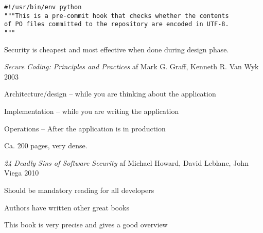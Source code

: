 \documentclass[Screen16to9,17pt]{foils}
\begin{document}
\begin{verbatim}
#!/usr/bin/env python
"""This is a pre-commit hook that checks whether the contents
of PO files committed to the repository are encoded in UTF-8.
"""
\end{verbatim}

{\small {}}


\centerline{Security is cheapest and most effective when done during design phase.}




\vskip 2cm
{\emph{Secure Coding: Principles and Practices} af Mark G. Graff, Kenneth R. Van Wyk 2003}



\begin{list1}
\item Architecture/design -- while you are thinking about the application
\item Implementation -- while you are writing the application
\item Operations -- After the application is in production
\item Ca. 200 pages, very dense.
\end{list1}



{\emph{24 Deadly Sins of Software Security} af Michael Howard, David Leblanc, John Viega 2010}

\begin{list1}
\item Should be mandatory reading for all developers
\item Authors have written other great books
\item This book is very precise and gives a good overview
\end{list1}

\end{document}
